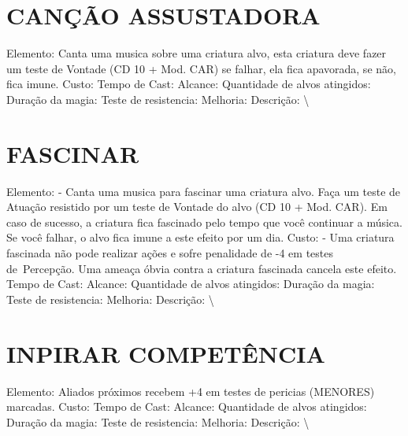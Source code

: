 \documentclass{article}%
\begin{document}
%
\section{CANÇÃO ASSUSTADORA}%
\label{sec:CANOASSUSTADORA}%
Elemento: Canta uma musica sobre uma criatura alvo, esta criatura deve fazer um teste de Vontade (CD 10 + Mod. CAR) se falhar, ela fica apavorada, se não, fica imune.\newline%
Custo: \newline%
Tempo de Cast: \newline%
Alcance: \newline%
Quantidade de alvos atingidos: \newline%
Duração da magia: \newline%
Teste de resistencia: \newline%
Melhoria: \newline%
Descrição: \textbackslash{}

%
\section{FASCINAR}%
\label{sec:FASCINAR}%
Elemento: {-} Canta uma musica para fascinar uma criatura alvo. Faça um teste de Atuação resistido por um teste de Vontade do alvo (CD 10 + Mod. CAR). Em caso de sucesso, a criatura fica fascinado pelo tempo que você continuar a música. Se você falhar, o alvo fica imune a este efeito por um dia.\newline%
Custo:   {-} Uma criatura fascinada não pode realizar ações e sofre penalidade de {-}4 em testes de~Percepção. Uma ameaça óbvia contra a criatura fascinada cancela este efeito.\newline%
Tempo de Cast: \newline%
Alcance: \newline%
Quantidade de alvos atingidos: \newline%
Duração da magia: \newline%
Teste de resistencia: \newline%
Melhoria: \newline%
Descrição: \textbackslash{}

%
\section{INPIRAR COMPETÊNCIA}%
\label{sec:INPIRARCOMPETNCIA}%
Elemento: Aliados próximos recebem +4 em testes de pericias (MENORES) marcadas.\newline%
Custo: \newline%
Tempo de Cast: \newline%
Alcance: \newline%
Quantidade de alvos atingidos: \newline%
Duração da magia: \newline%
Teste de resistencia: \newline%
Melhoria: \newline%
Descrição: \textbackslash{}
\end{document}

